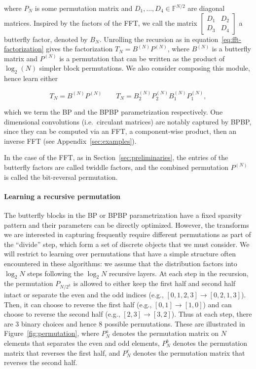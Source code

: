 where $P_N$ is some permutation matrix and $D_1, \dots, D_4 \in \mathbb{F}^{N/2}$
are diagonal matrices. Inspired by the factors of the FFT, we call the matrix
$

\begin{bmatrix} D_1 & D_2 \\ D_3 & D_4 \end{bmatrix}

$ a butterfly factor, denoted by $B_{N}$. Unrolling the recursion as in equation~\eqref{eq:fft-factorization} gives the factorization $T_N = B^{(N)} P^{(N)}$, where $B^{(N)}$ is a butterfly matrix and $P^{(N)}$ is a permutation that can be written as the product of $\log_2(N)$ simpler block permutations. We also consider composing this module, hence learn either

\begin{equation}
  \label{eq:BP}
  T_N = B^{(N)}P^{(N)} \qquad T_N = B_2^{(N)}P_2^{(N)}B_1^{(N)}P_1^{(N)},
\end{equation}

which we term the BP and the BPBP parametrization respectively. One dimensional convolutions (i.e.\ circulant matrices) are notably captured by BPBP, since they can be computed via an FFT, a component-wise product, then an inverse FFT (see Appendix~\ref{sec:examples}).

In the case of the FFT, as in Section~\ref{sec:preliminaries}, the entries of the butterfly factors are called twiddle factors, and the combined permutation $P^{(N)}$ is called the bit-reversal permutation.

\paragraph{Learning a recursive permutation}

The butterfly blocks in the BP or BPBP parametrization have a fixed sparsity pattern and their parameters can be directly optimized. However, the transforms we are interested in capturing frequently require different permutations as part of the ``divide'' step, which form a set of discrete objects that we must consider. We will restrict to learning over permutations that have a simple structure often encountered in these algorithms: we assume that the distribution factors into $\log_2 N$ steps following the $\log_2 N$ recursive layers. At each step in the recursion, the permutation $P_{N/2^k}$ is allowed to either keep the first half and second half intact or separate the even and the odd indices (e.g., $[0, 1, 2, 3] \to [0, 2, 1, 3]$). Then, it can choose to reverse the first half (e.g., $[0, 1] \to [1, 0]$) and can choose to reverse the second half (e.g., $[2, 3] \to [3, 2]$). Thus at each step, there are 3 binary choices and hence 8 possible permutations. These are illustrated in Figure~\ref{fig:permutation}, where $P_N^a$ denotes the permutation matrix on $N$ elements that separates the even and odd elements, $P_N^b$ denotes the permutation matrix that reverses the first half, and $P_N^c$ denotes the permutation matrix that reverses the second half.

